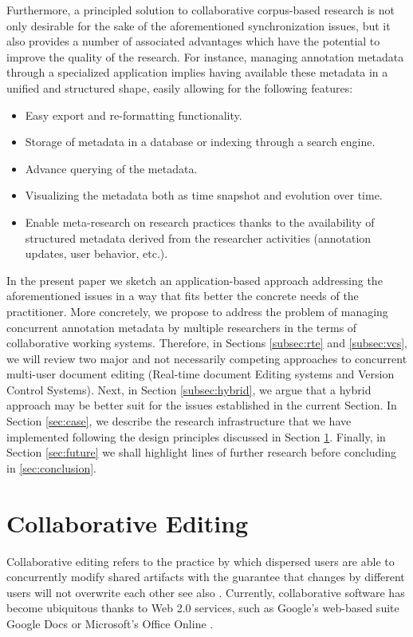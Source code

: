 \documentclass{sig-alternate}
\begin{document}
Furthermore, a principled solution to collaborative corpus-based research is not only
desirable for the sake of the aforementioned synchronization issues, but it also provides
a number of associated advantages which have the potential to improve the quality of the research.
For instance, managing annotation metadata through a specialized application implies
having available these metadata in a unified and structured shape, easily allowing
for the following features:

\begin{itemize}
\item Easy export and re-formatting functionality.
\item Storage of metadata in a database or indexing through a search engine.
\item Advance querying of the metadata.
\item Visualizing the metadata both as time snapshot and evolution over time.
\item Enable meta-research on research practices thanks to the availability of structured
  metadata derived from the researcher activities (annotation updates, user behavior, etc.).
\end{itemize}

In the present paper we sketch an application-based approach addressing the aforementioned
issues in a way that fits better the concrete needs of the practitioner.
More concretely, we propose to address the problem of managing concurrent annotation
metadata by multiple researchers in the terms of collaborative working systems.
Therefore, in Sections \ref{subsec:rte} and \ref{subsec:vcs}, we will review two major and
not necessarily competing approaches to concurrent multi-user document editing
(Real-time document Editing systems and Version Control Systems).
Next, in Section \ref{subsec:hybrid}, we argue that a hybrid approach may be better suit for
the issues established in the current Section.
In Section \ref{sec:case}, we describe the research infrastructure that we have implemented
following the design principles discussed in Section \ref{sec:cde}.
Finally, in Section \ref{sec:future} we shall highlight lines of further research before
concluding in \ref{sec:conclusion}.

\section{Collaborative Editing}\label{sec:cde}
Collaborative editing refers to the practice by which dispersed
users are able to concurrently modify shared artifacts with the guarantee that changes
by different users will not overwrite each other \textemdash see also \cite{Altmanninger2009}.
Currently, collaborative software has become ubiquitous thanks to Web 2.0 services, such as
Google's web-based suite Google Docs \cite{Googlea} or Microsoft's Office Online \cite{Microsoft}.
\end{document}
